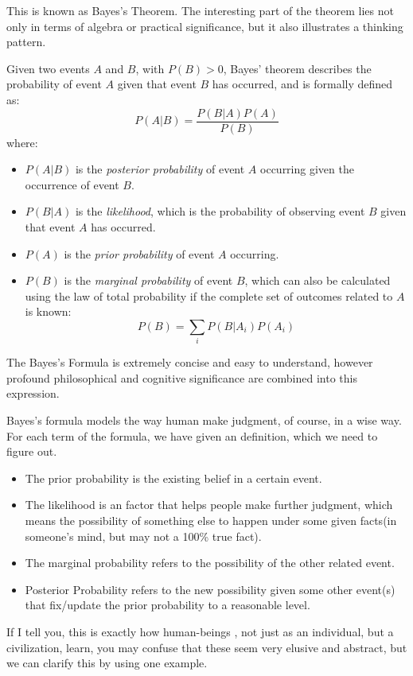        This is known as Bayes's Theorem. The interesting part of the theorem lies not only in terms of algebra or practical significance, but it also illustrates a thinking pattern.
       \begin{theorem}
       	 Given two events $A$ and $B$, with $P(B) > 0$, Bayes' theorem describes the probability of event $A$ given that event $B$ has occurred, and is formally defined as:
       	\[
       	P(A|B) = \frac{P(B|A)P(A)}{P(B)}
       	\]
       	where:
       	\begin{itemize}
       		\item $P(A|B)$ is the \textit{posterior probability} of event $A$ occurring given the occurrence of event $B$.
       		\item $P(B|A)$ is the \textit{likelihood}, which is the probability of observing event $B$ given that event $A$ has occurred.
       		\item $P(A)$ is the \textit{prior probability} of event $A$ occurring.
       		\item $P(B)$ is the \textit{marginal probability} of event $B$, which can also be calculated using the law of total probability if the complete set of outcomes related to $A$ is known:
       		\[
       		P(B) = \sum_{i} P(B|A_i)P(A_i)
       		\]
       	\end{itemize}
       \end{theorem}
       The Bayes's Formula is extremely concise and easy to understand, however profound philosophical and cognitive significance are combined into this expression. 
       
       Bayes's formula models the way human make judgment, of course, in a wise way. For each term of the formula, we have given an definition, which we need to figure out.
       \begin{itemize}
       	\item The prior probability is the existing belief in a certain event.
       	\item The likelihood is an factor that helps people make further judgment, which means the possibility of something else to happen under some given facts(in someone's mind, but may not a 100\% true fact).
       	\item The marginal probability refers to the possibility of the other related event. 
       	\item Posterior Probability refers to the new possibility given some other event(s) that fix/update the prior probability to a reasonable level.
       \end{itemize}
       If I tell you, this is exactly how human-beings , not just as an individual, but a civilization, learn, you may confuse that these seem very elusive and abstract, but we can clarify this by using one example.
       
